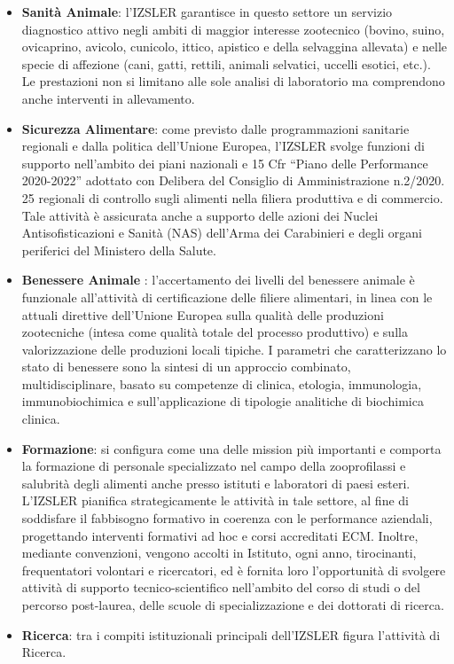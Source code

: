 \documentclass[
  12pt,
]{article}
\begin{document}
\begin{itemize}
\item
  \textbf{Sanità Animale}: l'IZSLER garantisce in questo settore un
  servizio diagnostico attivo negli ambiti di maggior interesse
  zootecnico (bovino, suino, ovicaprino, avicolo, cunicolo, ittico,
  apistico e della selvaggina allevata) e nelle specie di affezione
  (cani, gatti, rettili, animali selvatici, uccelli esotici, etc.). Le
  prestazioni non si limitano alle sole analisi di laboratorio ma
  comprendono anche interventi in allevamento.
\item
  \textbf{Sicurezza Alimentare}: come previsto dalle programmazioni
  sanitarie regionali e dalla politica dell'Unione Europea, l'IZSLER
  svolge funzioni di supporto nell'ambito dei piani nazionali e 15 Cfr
  ``Piano delle Performance 2020-2022'' adottato con Delibera del
  Consiglio di Amministrazione n.2/2020. 25 regionali di controllo sugli
  alimenti nella filiera produttiva e di commercio. Tale attività è
  assicurata anche a supporto delle azioni dei Nuclei Antisofisticazioni
  e Sanità (NAS) dell'Arma dei Carabinieri e degli organi periferici del
  Ministero della Salute.
\item
  \textbf{Benessere Animale} : l'accertamento dei livelli del benessere
  animale è funzionale all'attività di certificazione delle filiere
  alimentari, in linea con le attuali direttive dell'Unione Europea
  sulla qualità delle produzioni zootecniche (intesa come qualità totale
  del processo produttivo) e sulla valorizzazione delle produzioni
  locali tipiche. I parametri che caratterizzano lo stato di benessere
  sono la sintesi di un approccio combinato, multidisciplinare, basato
  su competenze di clinica, etologia, immunologia, immunobiochimica e
  sull'applicazione di tipologie analitiche di biochimica clinica.
\item
  \textbf{Formazione}: si configura come una delle mission più
  importanti e comporta la formazione di personale specializzato nel
  campo della zooprofilassi e salubrità degli alimenti anche presso
  istituti e laboratori di paesi esteri. L'IZSLER pianifica
  strategicamente le attività in tale settore, al fine di soddisfare il
  fabbisogno formativo in coerenza con le performance aziendali,
  progettando interventi formativi ad hoc e corsi accreditati ECM.
  Inoltre, mediante convenzioni, vengono accolti in Istituto, ogni anno,
  tirocinanti, frequentatori volontari e ricercatori, ed è fornita loro
  l'opportunità di svolgere attività di supporto tecnico-scientifico
  nell'ambito del corso di studi o del percorso post-laurea, delle
  scuole di specializzazione e dei dottorati di ricerca.
\item
  \textbf{Ricerca}: tra i compiti istituzionali principali dell'IZSLER
  figura l'attività di Ricerca.
\end{itemize}
\end{document}
